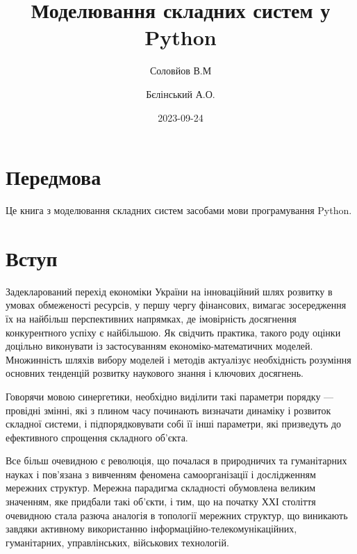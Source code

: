 \documentclass[
  letterpaper,
]{report}
\title{Моделювання складних систем у Python}
\author{Соловйов В.М \and Бєлінський А.О.}
\date{2023-09-24}
\renewcommand*\contentsname{Зміст}
\newcommand\contentsname{Зміст}
\begin{document}
\maketitle
\ifdefined\Shaded\renewenvironment{Shaded}{\begin{tcolorbox}[frame hidden, breakable, interior hidden, boxrule=0pt, enhanced, sharp corners, borderline west={3pt}{0pt}{shadecolor}]}{\end{tcolorbox}}\fi

\renewcommand*\contentsname{Зміст}
{
\hypersetup{linkcolor=}
\setcounter{tocdepth}{2}
\tableofcontents
}

\hypertarget{ux43fux435ux440ux435ux434ux43cux43eux432ux430}{%
\chapter*{Передмова}\label{ux43fux435ux440ux435ux434ux43cux43eux432ux430}}


Це книга з моделювання складних систем засобами мови програмування
Python.


\hypertarget{ux432ux441ux442ux443ux43f}{%
\chapter{Вступ}\label{ux432ux441ux442ux443ux43f}}

Задекларований перехід економіки України на інноваційний шлях розвитку в
умовах обмеженості ресурсів, у першу чергу фінансових, вимагає
зосередження їх на найбільш перспективних напрямках, де імовірність
досягнення конкурентного успіху є найбільшою. Як свідчить практика,
такого роду оцінки доцільно виконувати із застосуванням
економіко-математичних моделей. Множинність шляхів вибору моделей і
методів актуалізує необхідність розуміння основних тенденцій розвитку
наукового знання і ключових досягнень.

Говорячи мовою синергетики, необхідно виділити такі параметри порядку
--- провідні змінні, які з плином часу починають визначати динаміку і
розвиток складної системи, і підпорядковувати собі її інші параметри,
які призведуть до ефективного спрощення складного об'єкта.

Все більш очевидною є революція, що почалася в природничих та
гуманітарних науках і пов'язана з вивченням феномена самоорганізації і
дослідженням мережних структур. Мережна парадигма складності обумовлена
великим значенням, яке придбали такі об'єкти, і тим, що на початку ХХІ
століття очевидною стала разюча аналогія в топології мережних структур,
що виникають завдяки активному використанню
інформаційно-телекомунікаційних, гуманітарних, управлінських, військових
технологій.
\end{document}

